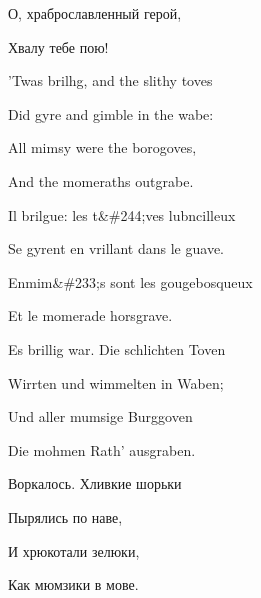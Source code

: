 О, храброславленный герой,

Хвалу тебе пою!

'Twas brilhg, and the slithy toves

Did gyre and gimble in the wabe:

All mimsy were the borogoves,

And the momeraths outgrabe.

Il brilgue: les t\&\#244;ves lubncilleux

Se gyrent en vrillant dans le guave.

Enmim\&\#233;s sont les gougebosqueux

Et le momerade horsgrave.

Es brillig war. Die schlichten Toven

Wirrten und wimmelten in Waben;

Und aller mumsige Burggoven

Die mohmen Rath' ausgraben.

Воркалось. Хливкие шорьки

Пырялись по наве,

И хрюкотали зелюки,

Как мюмзики в мове.

